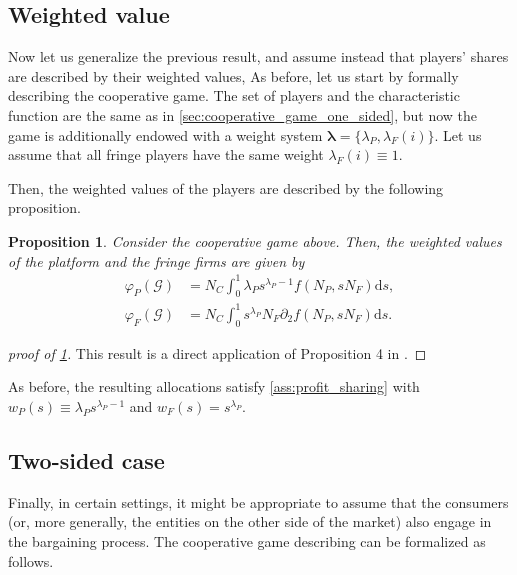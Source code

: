 \documentclass[a4paper]{article}
\newtheorem{proposition}{Proposition}
\newcommand{\ds}{\mathrm{d}s}
\begin{document}
\subsection{Weighted value}
\label{sec:cooperative_game_weighted}

Now let us generalize the previous result, and assume instead that players' shares are described by their weighted values,
As before, let us start by formally describing the cooperative game.
The set of players and the characteristic function are the same as in \cref{sec:cooperative_game_one_sided}, but now the game is additionally endowed with a weight system $\mathbf{\lambda} = \{\lambda_P, \lambda_{F}(i)\}$.
Let us assume that all fringe players have the same weight $\lambda_{F}(i) \equiv 1$.

Then, the weighted values of the players are described by the following proposition.

\begin{proposition}
    \label{prop:profit_sharing_weighted}
    Consider the cooperative game above.
    Then, the weighted values of the platform and the fringe firms are given by
    \begin{align*}
        \varphi_P(\mathcal{G}) &= N_C \int_0^1 \lambda_P s ^ {\lambda_P - 1} f(N_P, s N_F) \ds, \\
        \varphi_F(\mathcal{G}) &= N_C \int_0^1 s ^ {\lambda_P} N_F \partial_2 f(N_P, s N_F) \ds.
    \end{align*}
\end{proposition}

\begin{proof}[proof of \cref{prop:profit_sharing_weighted}]
    This result is a direct application of Proposition 4 in \textcite{stancsics2023value}.
\end{proof}

As before, the resulting allocations satisfy \cref{ass:profit_sharing} with $w_P(s) \equiv \lambda_P s ^ {\lambda_P - 1}$ and $w_F(s) = s ^ {\lambda_P}$.


\subsection{Two-sided case}
\label{sec:cooperative_game_two_sided}

Finally, in certain settings, it might be appropriate to assume that the consumers (or, more generally, the entities on the other side of the market) also engage in the bargaining process.
The cooperative game describing can be formalized as follows.
\end{document}
